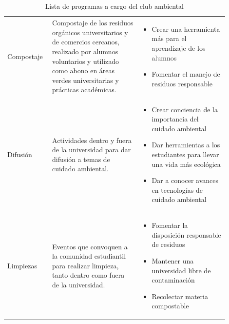 \begin{table}[H]

\centering
\caption{Lista de programas a cargo del club ambiental}
\label{tab:porgramas_del_club_ambiental}

\begin{threeparttable}

{\small{}

\begin{tabular}{M{0.15\linewidth}M{0.375\linewidth}M{0.375\linewidth}}\hline
    
     &  &  \\ \hline

    Compostaje & Compostaje de los residuos orgánicos universitarios y de comercios cercanos, realizado por alumnos voluntarios y utilizado como abono en áreas verdes universitarias y prácticas académicas.
    &
    \begin{itemize}
        \item Crear una herramienta más para el aprendizaje de los alumnos
        \item Fomentar el manejo de residuos responsable
    \end{itemize} \\

    Difusión & Actividades dentro y fuera de la universidad para dar difusión a temas de cuidado ambiental.
    &
    \begin{itemize}
        \item Crear conciencia de la importancia del cuidado ambiental
        \item Dar herramientas a los estudiantes para llevar una vida más ecológica
        \item Dar a conocer avances en tecnologías de cuidado ambiental
    \end{itemize} \\

    Limpiezas & Eventos que convoquen a la comunidad estudiantil para realizar limpieza, tanto dentro como fuera de la universidad.
    &
    \begin{itemize}
        \item Fomentar la disposición responsable de residuos
        \item Mantener una universidad libre de contaminación
        \item Recolectar materia compostable
    \end{itemize} \\


\end{tabular}}
\end{threeparttable}
\end{table}
